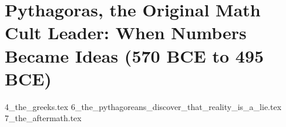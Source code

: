 \section{Pythagoras, the Original Math Cult Leader: When Numbers Became Ideas (570 BCE to 495 BCE)}

{4_the_greeks.tex}
{6_the_pythagoreans_discover_that_reality_is_a_lie.tex}
{7_the_aftermath.tex}